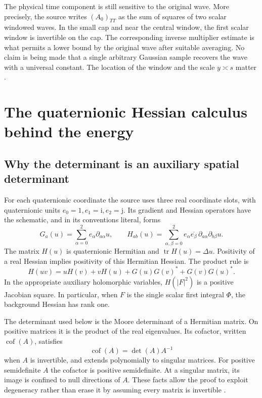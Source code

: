 \documentclass[11pt,a4paper]{article}
\numberwithin{equation}{section}
\theoremstyle{definition}
\theoremstyle{remark}
\newcommand{\tr}{\operatorname{tr}}
\begin{document}
The physical time component is still sensitive to the original wave. More
precisely, the source writes $(A_0)_{TT}$ as the sum of squares of two scalar
windowed waves. In the small cap and near the central window, the first scalar
window is invertible on the cap. The corresponding inverse multiplier estimate
is what permits a lower bound by the original wave after suitable averaging.
No claim is being made that a single arbitrary Gaussian sample recovers the
wave with a universal constant. The location of the window and the scale
$y\asymp s$ matter \cite{current,barrier}.

\section{The quaternionic Hessian calculus behind the energy}
\label{sec:calculus}
\subsection{Why the determinant is an auxiliary spatial determinant}
For each quaternionic coordinate the source uses three real coordinate slots,
with quaternionic units $e_0=1,e_1=\mathrm i,e_2=\mathrm j$. Its gradient and
Hessian operators have the schematic, and in its conventions literal, forms
\[
 G_a(u)=\sum_{\alpha=0}^2e_\alpha\partial_{a\alpha}u,
 \qquad
 H_{ab}(u)=\sum_{\alpha,\beta=0}^2
 e_\alpha\overline{e_\beta}\,
             \partial_{a\alpha}\partial_{b\beta}u.
\]
The matrix $H(u)$ is quaternionic Hermitian and $\tr H(u)=\Delta u$.
Positivity of a real Hessian implies positivity of this Hermitian Hessian.
The product rule is
\begin{equation}\label{eq:producthess}
 H(uv)=uH(v)+vH(u)+G(u)G(v)^*+G(v)G(u)^*.
\end{equation}
In the appropriate auxiliary holomorphic variables,
$H(|F|^2)$ is a positive Jacobian square. In particular, when $F$ is the
single scalar first integral $\Phi$, the background Hessian has rank one.

The determinant used below is the Moore determinant of a Hermitian matrix.
On positive matrices it is the product of the real eigenvalues. Its cofactor,
written $\operatorname{cof}(A)$, satisfies
\[
 \operatorname{cof}(A)=\det(A)A^{-1}
\]
when $A$ is invertible, and extends polynomially to singular matrices. For
positive semidefinite $A$ the cofactor is positive semidefinite. At a singular
matrix, its image is confined to null directions of $A$.
These facts allow the proof to exploit degeneracy rather than erase it by
assuming every matrix is invertible \cite{calculus}.
\end{document}
